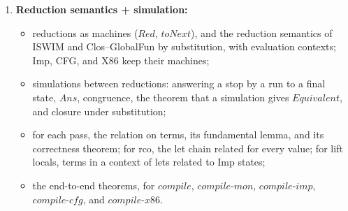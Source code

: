 \documentclass[10pt]{article}
\theoremstyle{acmplain}
\newcommand{\pass}[1]{\mathit{#1}}
\begin{document}
\begin{enumerate}
\begin{itemize}
  \item the end-to-end theorems, for $\pass{compile}$, $\pass{compile\text{-}mon}$,
    $\pass{compile\text{-}imp}$, $\pass{compile\text{-}cfg}$, and $\pass{compile\text{-}x86}$.
  \end{itemize}
\item \textbf{Reduction semantics + simulation:}
  \begin{itemize}
  \item reductions as machines ($\mathit{Red}$, $\mathit{toNext}$), and the
    reduction semantics of ISWIM and Clos--GlobalFun by substitution, with
    evaluation contexts; Imp, CFG, and X86 keep their machines;
  \item simulations between reductions: answering a stop by a run to a final
    state, $\mathit{Ans}$, congruence, the theorem that a simulation gives
    $\mathit{Equivalent}$, and closure under substitution;
  \item for each pass, the relation on terms, its fundamental lemma, and its
    correctness theorem; for rco, the let chain related for every value; for
    lift locals, terms in a context of lets related to Imp states;
  \item the end-to-end theorems, for $\pass{compile}$, $\pass{compile\text{-}mon}$,
    $\pass{compile\text{-}imp}$, $\pass{compile\text{-}cfg}$, and $\pass{compile\text{-}x86}$.
  \end{itemize}
\end{enumerate}
\end{document}
